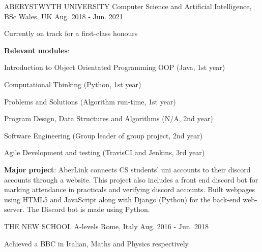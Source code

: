 

\begin{cventries}

  \cventry
    {ABERYSTWYTH UNIVERSITY} %
    {Computer Science and Artificial Intelligence, BSc} %
    {Wales, UK} %
    {Aug. 2018 - Jun. 2021} %
    {
      \begin{cvitems} %
        \item {Currently on track for a first-class honours}
        \item {\textbf{Relevant modules}:}\\
        \begin{cvitems}
          \item {Introduction to Object Orientated Programming OOP (Java, 1st year)}
          \item {Computational Thinking (Python, 1st year)}
          \item {Problems and Solutions (Algorithm run-time, 1st year)}
          \item {Program Design, Data Structures and Algorithms (N/A, 2nd year)}
          \item {Software Engineering (Group leader of group project, 2nd year)}
          \item {Agile Development and testing (TravisCI and Jenkins, 3rd year)}\\
        \end{cvitems}
        \item {\textbf{Major project}: AberLink connects CS students' uni accounts to their discord accounts through a website. This project also includes a front end discord bot for marking attendance in practicals and verifying discord accounts. Built webpages using HTML5 and JavaScript along with Django (Python) for the back-end web-server. The Discord bot is made using Python.}
      \end{cvitems}
    }
    
  \cventry
    {THE NEW SCHOOL} %
    {A-levels} %
    {Rome, Italy} %
    {Aug. 2016 - Jun. 2018} %
    {
      \begin{cvitems} %
        \item {Achieved a BBC in Italian, Maths and Physics respectively}
      \end{cvitems}
    }
    

\end{cventries}
